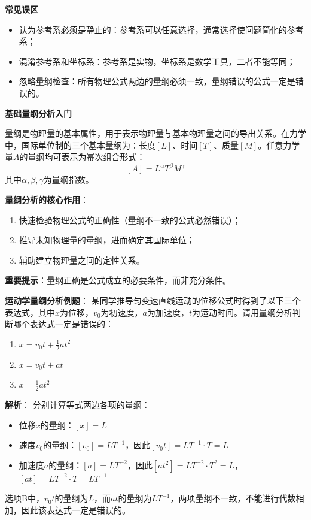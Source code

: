 \textbf{常见误区}
\begin{itemize}
\item 认为参考系必须是静止的：参考系可以任意选择，通常选择使问题简化的参考系；
\item 混淆参考系和坐标系：参考系是实物，坐标系是数学工具，二者不能等同；
\item 忽略量纲检查：所有物理公式两边的量纲必须一致，量纲错误的公式一定是错误的。
\end{itemize}

\textbf{基础量纲分析入门}

量纲是物理量的基本属性，用于表示物理量与基本物理量之间的导出关系。在力学中，国际单位制的三个基本量纲为：长度$[L]$、时间$[T]$、质量$[M]$。任意力学量$A$的量纲均可表示为幂次组合形式：
\[
[A] = L^\alpha T^\beta M^\gamma
\]
其中$\alpha,\beta,\gamma$为量纲指数。

\textbf{量纲分析的核心作用}：
\begin{enumerate}[label=(\arabic*)]
\item 快速检验物理公式的正确性（量纲不一致的公式必然错误）；
\item 推导未知物理量的量纲，进而确定其国际单位；
\item 辅助建立物理量之间的定性关系。
\end{enumerate}

\textbf{重要提示}：量纲正确是公式成立的必要条件，而非充分条件。

\textbf{运动学量纲分析例题}：
某同学推导匀变速直线运动的位移公式时得到了以下三个表达式，其中$x$为位移，$v_0$为初速度，$a$为加速度，$t$为运动时间。请用量纲分析判断哪个表达式一定是错误的：
\begin{enumerate}[label=(\Alph*)]
\item $x = v_0 t + \frac{1}{2} a t^2$
\item $x = v_0 t + a t$
\item $x = \frac{1}{2} a t^2$
\end{enumerate}

\textbf{解析}：
分别计算等式两边各项的量纲：
\begin{itemize}
\item 位移$x$的量纲：$[x] = L$
\item 速度$v_0$的量纲：$[v_0] = L T^{-1}$，因此$[v_0 t] = L T^{-1} \cdot T = L$
\item 加速度$a$的量纲：$[a] = L T^{-2}$，因此$[a t^2] = L T^{-2} \cdot T^2 = L$，$[a t] = L T^{-2} \cdot T = L T^{-1}$
\end{itemize}
选项B中，$v_0 t$的量纲为$L$，而$a t$的量纲为$L T^{-1}$，两项量纲不一致，不能进行代数相加，因此该表达式一定是错误的。

